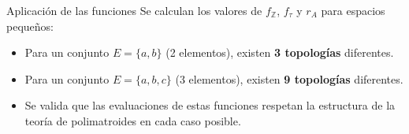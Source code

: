 \documentclass{beamer}
\begin{document}
  \begin{frame}{Aplicación de las funciones}
    Se calculan los valores de $f_{\mathbb{Z}}$, $f_{\tau}$ y $r_A$ para espacios pequeños:
    
    \vspace{0.5cm}
    \begin{itemize}[<+->]
      \item Para un conjunto $E=\{a,b\}$ (2 elementos), existen \textbf{3 topologías} diferentes.
      \item Para un conjunto $E=\{a,b,c\}$ (3 elementos), existen \textbf{9 topologías} diferentes.
      \item Se valida que las evaluaciones de estas funciones respetan la estructura de la teoría de polimatroides en cada caso posible.
    \end{itemize}
  \end{frame}
\end{document}
